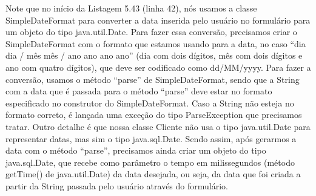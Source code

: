  


 
Note que no início da Listagem 5.43 (linha 42), nós usamos a classe SimpleDateFormat para converter a data inserida pelo usuário no formulário para um objeto do tipo java.util.Date. Para fazer essa conversão, precisamos criar o SimpleDateFormat com o formato que estamos usando para a data, no caso ``dia dia / mês mês / ano ano ano ano'' (dia com dois dígitos, mês com dois dígitos e ano com quatro dígitos), que deve ser codificado como dd/MM/yyyy.  Para fazer a conversão, usamos o método ``parse'' de SimpleDateFormat, sendo que a String com a data que é passada para o método ``parse'' deve estar no formato especificado no construtor do SimpleDateFormat. Caso a String não esteja no formato correto, é lançada uma exceção do tipo ParseException que precisamos tratar.
Outro detalhe é que nossa classe Cliente não usa o tipo java.util.Date para representar datas, mas sim o tipo java.sql.Date. Sendo assim, após gerarmos a data com o método ``parse'', precisamos ainda criar um objeto do tipo java.sql.Date, que recebe como parâmetro o tempo em milissegundos (método getTime() de java.util.Date) da data desejada, ou seja, da data que foi criada a partir da String passada pelo usuário através do formulário.


